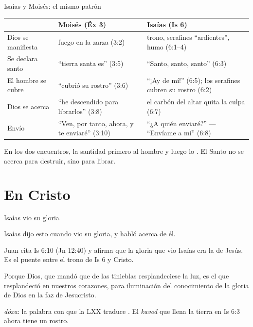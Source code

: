 \begin{frame}{Isaías y Moisés: el mismo patrón}
\scriptsize\renewcommand{\arraystretch}{1.3}
\begin{tabular}{@{}>{\RaggedRight\arraybackslash}p{2.2cm}>{\RaggedRight\arraybackslash}p{4.8cm}>{\RaggedRight\arraybackslash}p{4.8cm}@{}}
\toprule
& \textbf{Moisés (Éx 3)} & \textbf{Isaías (Is 6)} \\ \midrule
Dios se manifiesta & fuego en la zarza (3:2) & trono, serafines ``ardientes'', humo (6:1--4) \\
Se declara santo & ``tierra santa es'' (3:5) & ``Santo, santo, santo'' (6:3) \\
El hombre se cubre & ``cubrió su rostro'' (3:6) & ``¡Ay de mí!'' (6:5); los serafines cubren su rostro (6:2) \\
Dios se acerca & ``he descendido para librarlos'' (3:8) & el carbón del altar quita la culpa (6:7) \\
Envío & ``Ven, por tanto, ahora, y te enviaré'' (3:10) & ``¿A quién enviaré?'' --- ``Envíame a mí'' (6:8) \\
\bottomrule
\end{tabular}\par\medskip
\small En los dos encuentros, la santidad primero  al hombre y luego lo . El Santo no se acerca para destruir, sino para librar.
\par\smallskip{}
\end{frame}

\section{En Cristo}

\begin{frame}{Isaías vio su gloria}
\begin{cita}Isaías dijo esto cuando vio su gloria, y habló acerca de él.\end{cita}
\small Juan cita Is 6:10 (Jn 12:40) y afirma que la gloria que vio Isaías era la de Jesús. Es el puente entre el trono de Is 6 y Cristo.\par\medskip
{}
\begin{cita}Porque Dios, que mandó que de las tinieblas resplandeciese la luz, es el que resplandeció en nuestros corazones, para iluminación del conocimiento de la gloria de Dios en la faz de Jesucristo.\end{cita}
\scriptsize{} \emph{dóxa}: la palabra con que la LXX traduce . El \emph{kavod} que llena la tierra en Is 6:3 ahora tiene un rostro.
\end{frame}

